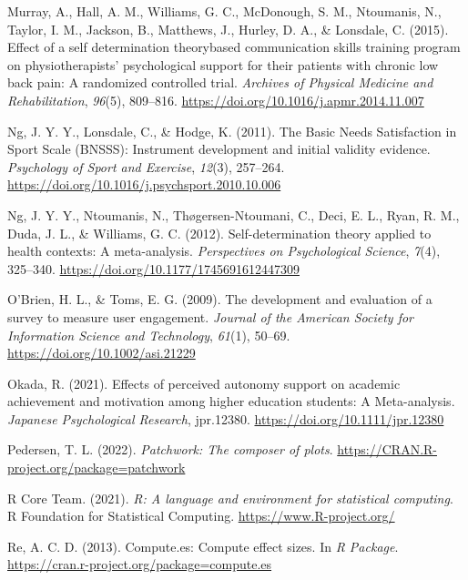 \documentclass[
  man, donotrepeattitle,mask,floatsintext]{apa7}
\newlength{\cslhangindent}
\newlength{\cslentryspacingunit} %
\newenvironment{CSLReferences}[2] %
 {%
  \setlength{\parindent}{0pt}
  \ifodd #1
  \let\oldpar\par
  \def\par{\hangindent=\cslhangindent\oldpar}
  \fi
  \setlength{\parskip}{#2\cslentryspacingunit}
 }%
 {}
\begin{document}
\begin{CSLReferences}{1}{0}
\leavevmode{}%
Murray, A., Hall, A. M., Williams, G. C., McDonough, S. M., Ntoumanis, N., Taylor, I. M., Jackson, B., Matthews, J., Hurley, D. A., \& Lonsdale, C. (2015). Effect of a self determination theory\textendash based communication skills training program on physiotherapists' psychological support for their patients with chronic low back pain: {A} randomized controlled trial. \emph{Archives of Physical Medicine and Rehabilitation}, \emph{96}(5), 809--816. \url{https://doi.org/10.1016/j.apmr.2014.11.007}

\leavevmode{}%
Ng, J. Y. Y., Lonsdale, C., \& Hodge, K. (2011). The {Basic Needs Satisfaction} in {Sport Scale} ({BNSSS}): {Instrument} development and initial validity evidence. \emph{Psychology of Sport and Exercise}, \emph{12}(3), 257--264. \url{https://doi.org/10.1016/j.psychsport.2010.10.006}

\leavevmode{}%
Ng, J. Y. Y., Ntoumanis, N., Thøgersen-Ntoumani, C., Deci, E. L., Ryan, R. M., Duda, J. L., \& Williams, G. C. (2012). Self-determination theory applied to health contexts: {A} meta-analysis. \emph{Perspectives on Psychological Science}, \emph{7}(4), 325--340. \url{https://doi.org/10.1177/1745691612447309}

\leavevmode{}%
O'Brien, H. L., \& Toms, E. G. (2009). The development and evaluation of a survey to measure user engagement. \emph{Journal of the American Society for Information Science and Technology}, \emph{61}(1), 50--69. \url{https://doi.org/10.1002/asi.21229}

\leavevmode{}%
Okada, R. (2021). Effects of perceived autonomy support on academic achievement and motivation among higher education students: {A Meta-analysis}. \emph{Japanese Psychological Research}, jpr.12380. \url{https://doi.org/10.1111/jpr.12380}

\leavevmode{}%
Pedersen, T. L. (2022). \emph{Patchwork: The composer of plots}. \url{https://CRAN.R-project.org/package=patchwork}

\leavevmode{}%
R Core Team. (2021). \emph{R: A language and environment for statistical computing}. R Foundation for Statistical Computing. \url{https://www.R-project.org/}

\leavevmode{}%
Re, A. C. D. (2013). Compute.es: Compute effect sizes. In \emph{R Package}. \url{https://cran.r-project.org/package=compute.es}


\end{CSLReferences}
\end{document}

